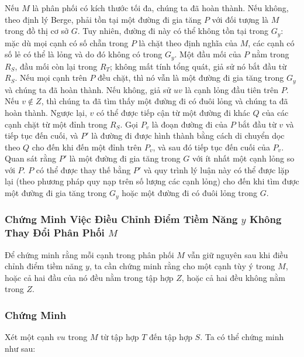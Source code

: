 Nếu \( M \) là phân phối có kích thước tối đa, chúng ta đã hoàn thành. Nếu không, theo định lý Berge, phải tồn tại một đường đi gia tăng \( P \) với đối tượng là \( M \) trong đồ thị cơ sở \( G \). Tuy nhiên, đường đi này có thể không tồn tại trong \( G_y \): mặc dù mọi cạnh có số chẵn trong \( P \) là chặt theo định nghĩa của \( M \), các cạnh có số lẻ có thể là lỏng và do đó không có trong \( G_y \). Một đầu mối của \( P \) nằm trong \( R_S \), đầu mối còn lại trong \( R_T \); không mất tính tổng quát, giả sử nó bắt đầu từ \( R_S \). Nếu mọi cạnh trên \( P \) đều chặt, thì nó vẫn là một đường đi gia tăng trong \( G_y \) và chúng ta đã hoàn thành. Nếu không, giả sử \( uv \) là cạnh lỏng đầu tiên trên \( P \). Nếu \( v \notin Z \), thì chúng ta đã tìm thấy một đường đi có đuôi lỏng và chúng ta đã hoàn thành. Ngược lại, \( v \) có thể được tiếp cận từ một đường đi khác \( Q \) của các cạnh chặt từ một đỉnh trong \( R_S \). Gọi \( P_v \) là đoạn đường đi của \( P \) bắt đầu từ \( v \) và tiếp tục đến cuối, và \( P' \) là đường đi được hình thành bằng cách di chuyển dọc theo \( Q \) cho đến khi đến một đỉnh trên \( P_v \), và sau đó tiếp tục đến cuối của \( P_v \). Quan sát rằng \( P' \) là một đường đi gia tăng trong \( G \) với ít nhất một cạnh lỏng so với \( P \). \( P \) có thể được thay thế bằng \( P' \) và quy trình lý luận này có thể được lặp lại (theo phương pháp quy nạp trên số lượng các cạnh lỏng) cho đến khi tìm được một đường đi gia tăng trong \( G_y \) hoặc một đường đi có đuôi lỏng trong \( G \).
\subsubsection{Chứng Minh Việc Điều Chỉnh Điểm Tiềm Năng \( y \) Không Thay Đổi Phân Phối \( M \)}
Để chứng minh rằng mỗi cạnh trong phân phối \( M \) vẫn giữ nguyên sau khi điều chỉnh điểm tiềm năng \( y \), ta cần chứng minh rằng cho một cạnh tùy ý trong \( M \), hoặc cả hai đầu của nó đều nằm trong tập hợp \( Z \), hoặc cả hai đều không nằm trong \( Z \). 

\subsubsection*{Chứng Minh}

Xét một cạnh \( vu \) trong \( M \) từ tập hợp \( T \) đến tập hợp \( S \). Ta có thể chứng minh như sau:

